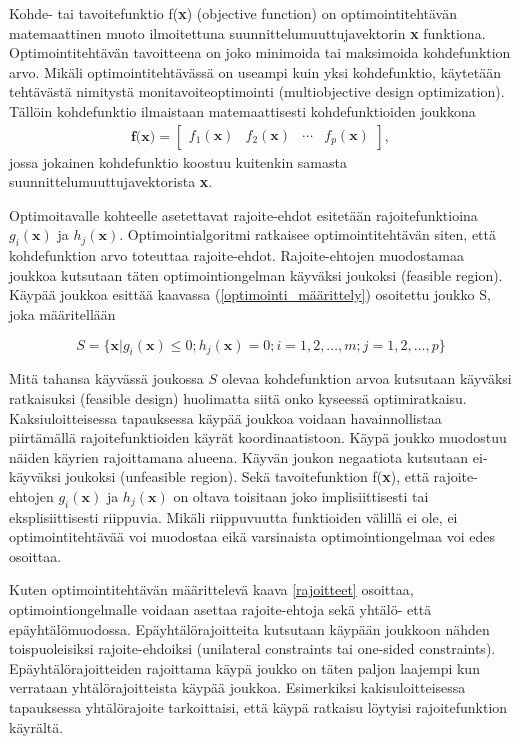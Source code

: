\documentclass[12pt]{article}
\newenvironment{content}{\pagenumbering{arabic}}{}
\begin{document}
\begin{content}
Kohde- tai tavoitefunktio f(\textbf{x}) (objective function) on optimointitehtävän matemaattinen muoto ilmoitettuna suunnittelumuuttujavektorin \textbf{x} funktiona. Optimointitehtävän tavoitteena on joko minimoida tai maksimoida kohdefunktion arvo. Mikäli optimointitehtävässä on useampi kuin yksi kohdefunktio, käytetään tehtävästä nimitystä monitavoiteoptimointi (multiobjective design optimization). Tällöin kohdefunktio ilmaistaan matemaattisesti kohdefunktioiden joukkona 
\begin{align}
\textbf{f(x)} = \begin{bmatrix}
f_1(\textbf{x}) &  f_2(\textbf{x}) & \cdots & f_p(\textbf{x})
\end{bmatrix},
\end{align}
jossa jokainen kohdefunktio koostuu kuitenkin samasta suunnittelumuuttujavektorista \textbf{x}.

Optimoitavalle kohteelle asetettavat rajoite-ehdot esitetään rajoitefunktioina $g_i(\textbf{x})$ ja $h_j(\textbf{x})$. Optimointialgoritmi ratkaisee optimointitehtävän siten, että kohdefunktion arvo toteuttaa rajoite-ehdot. Rajoite-ehtojen muodostamaa joukkoa kutsutaan täten optimointiongelman käyväksi joukoksi (feasible region). Käypää joukkoa esittää kaavassa (\ref{optimointi_määrittely}) osoitettu joukko S, joka määritellään 

\begin{equation}
\label{käypä_joukko}
S = \{\textbf{x} | g_i(\textbf{x}) \leq 0; h_j(\textbf{x}) = 0; i = 1, 2, \dots,m; j = 1, 2, \dots,p\} 
\end{equation}

Mitä tahansa käyvässä joukossa $S$ olevaa kohdefunktion arvoa kutsutaan käyväksi ratkaisuksi (feasible design) huolimatta siitä onko kyseessä optimiratkaisu. Kaksiuloitteisessa tapauksessa käypää joukkoa voidaan havainnollistaa piirtämällä rajoitefunktioiden käyrät koordinaatistoon. Käypä joukko muodostuu näiden käyrien rajoittamana alueena. Käyvän joukon negaatiota kutsutaan ei-käyväksi joukoksi (unfeasible region). Sekä tavoitefunktion f(\textbf{x}), että rajoite-ehtojen $g_i(\textbf{x})$ ja $h_j(\textbf{x})$ on oltava toisitaan joko implisiittisesti tai eksplisiittisesti riippuvia. Mikäli riippuvuutta funktioiden välillä ei ole, ei optimointitehtävää voi muodostaa eikä varsinaista optimointiongelmaa voi edes osoittaa. \parencite[43]{arora} 

Kuten optimointitehtävän määrittelevä kaava \eqref{rajoitteet} osoittaa, optimointiongelmalle voidaan asettaa rajoite-ehtoja sekä yhtälö- että epäyhtälömuodossa. Epäyhtälörajoitteita kutsutaan käypään joukkoon nähden toispuoleisiksi rajoite-ehdoiksi (unilateral constraints tai one-sided constraints). Epäyhtälörajoitteiden rajoittama käypä joukko on täten paljon laajempi kun verrataan yhtälörajoitteista käypää joukkoa. Esimerkiksi kakisuloitteisessa tapauksessa yhtälörajoite tarkoittaisi, että käypä ratkaisu löytyisi rajoitefunktion käyrältä. \parencite[16-18]{arora} 


\end{content}
\end{document}
